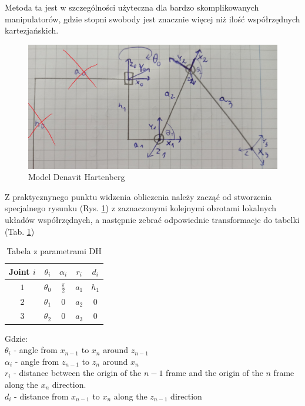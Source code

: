 Metoda ta jest w szczególności użyteczna dla bardzo skomplikowanych manipulatorów, gdzie stopni swobody jest znacznie więcej niż ilość współrzędnych kartezjańskich.\\

\begin{figure}[h!]
\includegraphics[width=\textwidth]{img/DH_model.jpg}
\caption{Model Denavit Hartenberg}
\label{math_model_DH}
\end{figure}

Z praktycznynego punktu widzenia obliczenia należy zacząć od stworzenia specjalnego rysunku (Rys. \ref{math_model_DH}) z zaznaczonymi kolejnymi obrotami lokalnych układów współrzędnych, a następnie zebrać odpowiednie transformacje do tabelki (Tab. \ref{table:DH_table})\\

\begin{table}[h!]
\centering
\begin{tabular}{c | c c c c }
 Joint $i$ & $\theta_i$ & $\alpha_i$ & $r_i$ & $d_i$ \\
 \hline
 $1$  & $\theta_0$ & $\frac{\pi}{2}$ & $a_1$ & $h_1$ \\
 $2$  & $\theta_1$ & $0$ & $a_2$ & $0$ \\
 $3$  & $\theta_2$ & $0$ & $a_3$ & $0$ \\
\end{tabular}
\caption{Tabela z parametrami DH}
\label{table:DH_table}
\end{table}

Gdzie: \\
$\theta_i$ - angle from $x_{n-1}$ to $x_n$ around $z_{n-1}$\\
$\alpha_i$ - angle from $z_{n-1}$ to $z_n$ around $x_n$\\
$r_i$ - distance between the origin of the $n-1$ frame and the origin of the $n$ frame along the $x_n$ direction.\\ 
$d_i$ - distance from $x_{n-1}$ to $x_n$ along the $z_{n-1}$ direction\\

